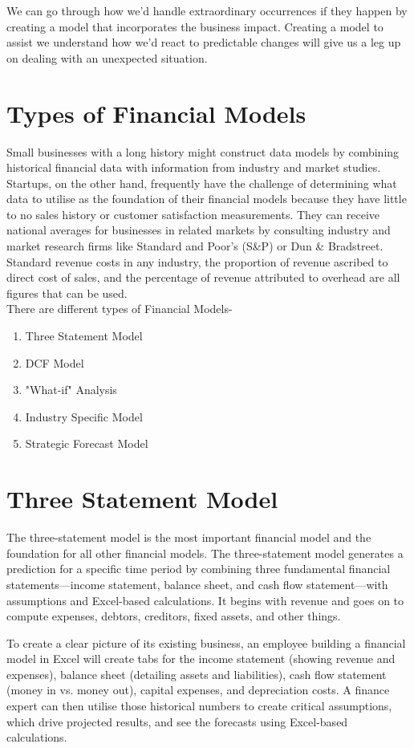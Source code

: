 \documentclass{article}
\begin{document}
We can go through how we'd handle extraordinary occurrences if they happen by creating a model that incorporates the business impact. Creating a model to assist we understand how we'd react to predictable changes will give us a leg up on dealing with an unexpected situation.

\section{Types of Financial Models}
Small businesses with a long history might construct data models by combining historical financial data with information from industry and market studies. Startups, on the other hand, frequently have the challenge of determining what data to utilise as the foundation of their financial models because they have little to no sales history or customer satisfaction measurements. They can receive national averages for businesses in related markets by consulting industry and market research firms like Standard and Poor's (S&P) or Dun & Bradstreet. Standard revenue costs in any industry, the proportion of revenue ascribed to direct cost of sales, and the percentage of revenue attributed to overhead are all figures that can be used.
\\
There are different types of Financial Models-
\begin{enumerate}
    \item Three Statement Model
    \item DCF Model
    \item "What-if" Analysis
    \item Industry Specific Model
    \item Strategic Forecast Model
\end{enumerate}
\section{Three Statement Model}
The three-statement model is the most important financial model and the foundation for all other financial models. The three-statement model generates a prediction for a specific time period by combining three fundamental financial statements—income statement, balance sheet, and cash flow statement—with assumptions and Excel-based calculations. It begins with revenue and goes on to compute expenses, debtors, creditors, fixed assets, and other things.

To create a clear picture of its existing business, an employee building a financial model in Excel will create tabs for the income statement (showing revenue and expenses), balance sheet (detailing assets and liabilities), cash flow statement (money in vs. money out), capital expenses, and depreciation costs. A finance expert can then utilise those historical numbers to create critical assumptions, which drive projected results, and see the forecasts using Excel-based calculations.
\end{document}

